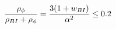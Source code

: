 \begin{equation}
{\rho_{\phi} \over {\rho_{BI}+\rho_{\phi}}}={{3(1+w_{BI})} \over \alpha^2} \le 0.2
\label{nuceq}
\end{equation}

